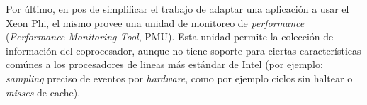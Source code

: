 Por \'ultimo, en pos de simplificar el trabajo de adaptar una aplicaci\'on a usar el Xeon Phi, el mismo provee una unidad de monitoreo de \textit{performance} (\textit{Performance
Monitoring Tool}, PMU). Esta unidad permite la colecci\'on de informaci\'on del coprocesador, aunque no tiene soporte para ciertas caracter\'isticas com\'unes a los procesadores
de lineas m\'as est\'andar de Intel (por ejemplo: \textit{sampling} preciso de eventos por \textit{hardware}, como por ejemplo ciclos sin haltear o \textit{misses} de cache).
